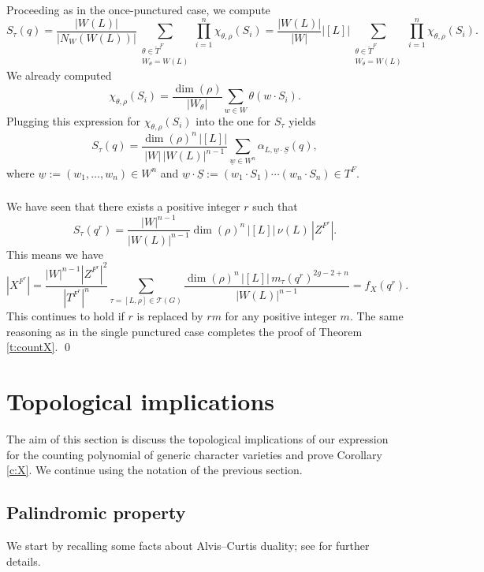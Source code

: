 \documentclass[12pt]{amsart}
\theoremstyle{plain}
\theoremstyle{definition}
\theoremstyle{remark}
\newcommand{\cT}{\mathcal{T}}
\begin{document}
\subsubsection{} Proceeding as in the once-punctured case, we compute
\[
S_\tau(q) = \frac{|W(L)|}{|N_W(W(L))|} 
\sum_{\substack{\theta\in \check{T}^F \\ W_\theta = W(L)}} 
\prod_{i=1}^n \chi_{\theta,\rho}(S_i)
= \frac{|W(L)|}{|W|} |[L]| \sum_{\substack{\theta\in \check{T}^F \\ W_\theta = W(L)}} 
\prod_{i=1}^n \chi_{\theta,\rho}(S_i).
\]
We already computed 
\[
\chi_{\theta,\rho}(S_i) = \frac{\dim(\rho)}{|W_\theta|} \sum_{w\in W} \theta(w\cdot S_i).
\]
Plugging this expression for $\chi_{\theta,\rho}(S_i)$ into the one for $S_\tau$ yields
\[
S_\tau(q) = \frac{\dim(\rho)^n\, |[L]|}{|W|\, |W(L)|^{n-1}} \sum_{\underline{w} \in W^n} \alpha_{L,\underline{w}\cdot\underline{S}}(q),
\]
where $\underline{w} := (w_1,\ldots,w_n)\in W^n$ and $\underline{w}\cdot\underline{S} := (w_1\cdot S_1)\cdots(w_n\cdot S_n)\in T^F$. 

\subsubsection{} We have seen that there exists a positive integer $r$ such that 
\[
S_\tau(q^r) = \frac{|W|^{n-1}}{|W(L)|^{n-1}} \dim(\rho)^n\, |[L]|\, \nu(L)\, |Z^{F^r}|.
\]
This means we have
\begin{equation}\label{eq:mainFormula}
|X^{F^r}| = \frac{|W|^{n-1}|Z^{F^r}|^2}{|T^{F^r}|^n} 
\sum_{\tau=[L,\rho]\in\cT(G)} 
\frac{\dim(\rho)^n\, |[L]|\, m_\tau(q^r)^{2g-2+n}}{|W(L)|^{n-1}} 
= f_X(q^r).
\end{equation}
This continues to hold if $r$ is replaced by $rm$ for any positive integer $m$. The same reasoning as in the single punctured case completes the proof of Theorem \ref{t:countX}.
\qed


\section{Topological implications} \label{s:topology} The aim of this section is discuss the topological implications of our expression for the counting polynomial of generic character varieties and prove Corollary \ref{c:X}. 
We continue using the notation of the previous section. 


\subsection{Palindromic property} \label{s:palindromic} We start by recalling some facts about Alvis--Curtis duality; see \cite[\S 7.2]{DM20} for further details. 
\end{document}
